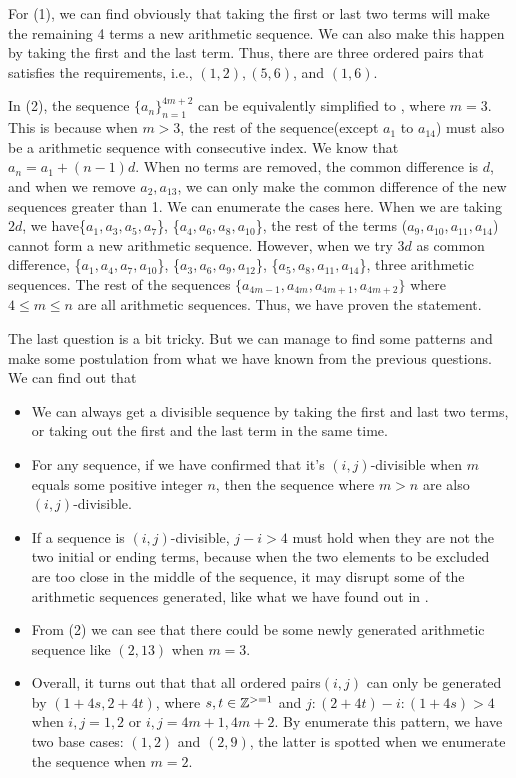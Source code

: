 \begin{solution}
    For (1), we can find obviously that taking the first or last two terms will make the remaining 4 terms a new arithmetic sequence. We can also make this happen by taking the first and the last term. Thus, there are three ordered pairs that satisfies the requirements, i.e., $(1,2), (5,6)$, and $(1,6)$.

    In (2), the sequence $\{a_n\}_{n=1}^{4m+2}$ can be equivalently simplified to , where $m=3$. This is because when $m > 3$, the rest of the sequence(except $a_1$ to $a_{14}$) must also be a arithmetic sequence with consecutive index. We know that $a_n=a_1 + (n-1)d$. When no terms are removed, the common difference is $d$, and when we remove $a_2, a_{13}$, we can only make the common difference of the new sequences greater than 1. We can enumerate the cases here. When we are taking $2d$, we have\{$a_1, a_3, a_5, a_7$\}, \{$a_4, a_6, a_8, a_{10}$\}, the rest of the terms ($a_9, a_{10}, a_{11}, a_{14}$) cannot form a new arithmetic sequence. However, when we try $3d$ as common difference, \{$a_1,a_4,a_7,a_{10}$\}, \{$a_3,a_6,a_9,a_{12}$\}, \{$a_5,a_8,a_{11},a_{14}$\}, three arithmetic sequences. The rest of the sequences $\{a_{4m-1}, a_{4m},a_{4m+1},a_{4m+2}\}$ where $4\leq m \leq n$ are all arithmetic sequences. Thus, we have proven the statement.

    The last question is a bit tricky. But we can manage to find some patterns and make some postulation from what we have known from the previous questions. We can find out that 
    \begin{itemize}
        \item We can always get a divisible sequence by taking the first and last two terms, or taking out the first and the last term in the same time.
        \item For any sequence, if we have confirmed that it's $(i,j)$-divisible when $m$ equals some positive integer $n$, then the sequence where $m > n$ are also $(i,j)$-divisible.
        \item If a sequence is $(i,j)$-divisible, $j-i > 4$ must hold when they are not the two initial or ending terms, because when the two elements to be excluded are too close in the middle of the sequence, it may disrupt some of the arithmetic sequences generated, like what we have found out in .
        \item From (2) we can see that there could be some newly generated arithmetic sequence like $(2,13)$ when $m=3$.
        \item Overall, it turns out that that all ordered pairs$(i,j)$ can only be generated by $(1+4s, 2+4t)$, where $s,t\in \mathbb{Z}^{>=1}$ and $j:(2+4t)-i:(1+4s)>4$ when $i,j=1,2$ or $i,j=4m+1, 4m+2$. By enumerate this pattern, we have two base cases: $(1,2)$ and $(2,9)$, the latter is spotted when we enumerate the sequence when $m=2$.
    \end{itemize}


\end{solution}
